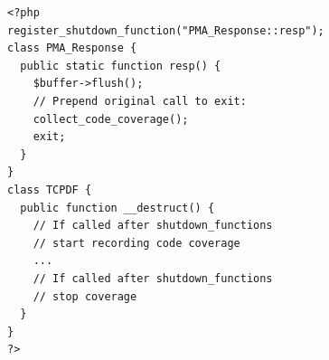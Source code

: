 \begin{figure}[t]
\begin{lstlisting}[frame=single, caption={Code rewritten by the debloating framework to ensure correct code coverage of corner cases.},captionpos=b, label={listing:rewriting_webapps}]
<?php
register_shutdown_function("PMA_Response::resp");
class PMA_Response {
  public static function resp() {
    $buffer->flush();
    // Prepend original call to exit:
    collect_code_coverage();
    exit;
  }
}
class TCPDF {
  public function __destruct() {
    // If called after shutdown_functions
    // start recording code coverage
    ...
    // If called after shutdown_functions
    // stop coverage
  }
}
?>
\end{lstlisting}
\end{figure}
